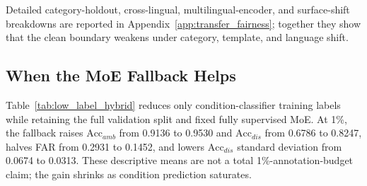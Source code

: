 \documentclass{ieeeaccess}
\newcommand{\accamb}{\mathrm{Acc}_{amb}}
\newcommand{\accdis}{\mathrm{Acc}_{dis}}
\begin{document}
Detailed category-holdout, cross-lingual, multilingual-encoder, and surface-shift breakdowns are reported in Appendix~\ref{app:transfer_fairness}; together they show that the clean boundary weakens under category, template, and language shift.

\subsection{When the MoE Fallback Helps}
Table~\ref{tab:low_label_hybrid} reduces only condition-classifier training labels while retaining the full validation split and fixed fully supervised MoE. At 1\%, the fallback raises $\accamb$ from 0.9136 to 0.9530 and $\accdis$ from 0.6786 to 0.8247, halves FAR from 0.2931 to 0.1452, and lowers $\accdis$ standard deviation from 0.0674 to 0.0313. These descriptive means are not a total 1\%-annotation-budget claim; the gain shrinks as condition prediction saturates.
\end{document}
